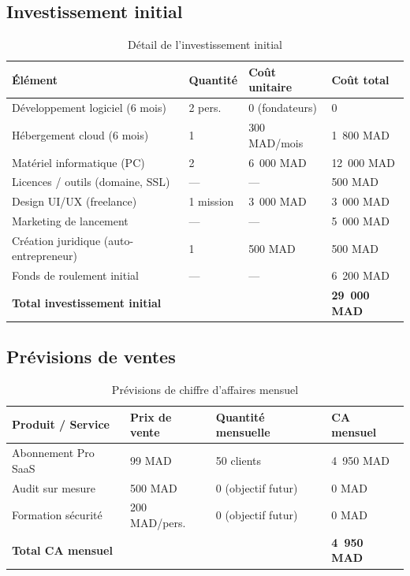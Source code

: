 \documentclass[12pt,a4paper]{report}
\newcommand{\hdr}[1]{\cellcolor{gray!15}\textbf{#1}}
\newcommand{\rowA}{\rowcolor{gray!8}}
\begin{document}
\subsection{Investissement initial}

\begin{table}[H]
\centering
\caption{Détail de l'investissement initial}
\begin{tabular}{p{6cm}p{2cm}p{2.5cm}p{2.5cm}}
\toprule
\hdr{Élément} & \hdr{Quantité} & \hdr{Coût unitaire} & \hdr{Coût total} \\
\midrule
Développement logiciel (6 mois) & 2 pers. & 0 (fondateurs) & 0 \\
\rowA Hébergement cloud (6 mois) & 1 & 300 MAD/mois & 1~800 MAD \\
Matériel informatique (PC) & 2 & 6~000 MAD & 12~000 MAD \\
\rowA Licences / outils (domaine, SSL) & --- & --- & 500 MAD \\
Design UI/UX (freelance) & 1 mission & 3~000 MAD & 3~000 MAD \\
\rowA Marketing de lancement & --- & --- & 5~000 MAD \\
Création juridique (auto-entrepreneur) & 1 & 500 MAD & 500 MAD \\
\rowA Fonds de roulement initial & --- & --- & 6~200 MAD \\
\midrule
\rowcolor{gray!12}\textbf{Total investissement initial} & & & \textbf{29~000 MAD} \\
\bottomrule
\end{tabular}
\end{table}

\subsection{Prévisions de ventes}

\begin{table}[H]
\centering
\caption{Prévisions de chiffre d'affaires mensuel}
\begin{tabular}{p{4cm}p{2.5cm}p{3cm}p{3cm}}
\toprule
\hdr{Produit / Service} & \hdr{Prix de vente} & \hdr{Quantité mensuelle} & \hdr{CA mensuel} \\
\midrule
Abonnement Pro SaaS & 99 MAD & 50 clients & 4~950 MAD \\
\rowA Audit sur mesure & 500 MAD & 0 (objectif futur) & 0 MAD \\
Formation sécurité & 200 MAD/pers. & 0 (objectif futur) & 0 MAD \\
\midrule
\rowcolor{gray!12}\textbf{Total CA mensuel} & & & \textbf{4~950 MAD} \\
\bottomrule
\end{tabular}
\end{table}
\end{document}
